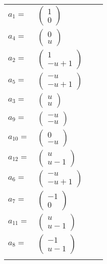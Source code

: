 \documentclass[1p]{elsarticle_modified}
\theoremstyle{definition}
\begin{document}
\begin{tabular}{m{7pt} m{180pt} m{7pt} m{180pt} }
\flushright $a_{1}=$&$\begin{pmatrix}1\\0\end{pmatrix}$ \\
\flushright $a_{4}=$&$\begin{pmatrix}0\\u\end{pmatrix}$ \\
\flushright $a_{2}=$&$\begin{pmatrix}1\\- u+1\end{pmatrix}$ \\
\flushright $a_{5}=$&$\begin{pmatrix}- u\\- u+1\end{pmatrix}$ \\
\flushright $a_{3}=$&$\begin{pmatrix}u\\u\end{pmatrix}$ \\
\flushright $a_{9}=$&$\begin{pmatrix}- u\\- u\end{pmatrix}$ \\
\flushright $a_{10}=$&$\begin{pmatrix}0\\- u\end{pmatrix}$ \\
\flushright $a_{12}=$&$\begin{pmatrix}u\\u-1\end{pmatrix}$ \\
\flushright $a_{6}=$&$\begin{pmatrix}- u\\- u+1\end{pmatrix}$ \\
\flushright $a_{7}=$&$\begin{pmatrix}-1\\0\end{pmatrix}$ \\
\flushright $a_{11}=$&$\begin{pmatrix}u\\u-1\end{pmatrix}$ \\
\flushright $a_{8}=$&$\begin{pmatrix}-1\\u-1\end{pmatrix}$\\&\end{tabular}
\end{document}
